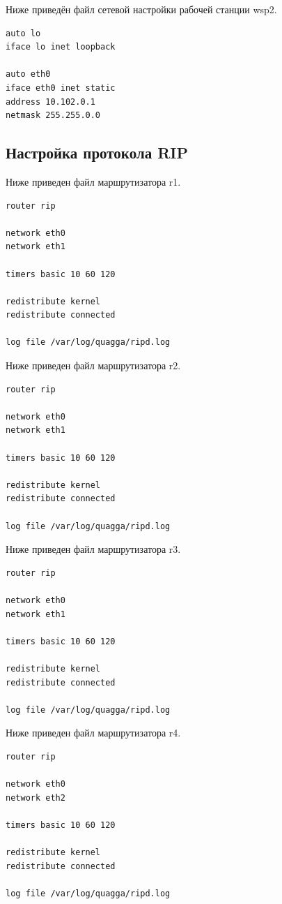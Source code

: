 \documentclass[a4paper,12pt]{article}
\begin{document}
Ниже приведён файл сетевой настройки рабочей станции wsp2.

\begin{Verbatim}
auto lo
iface lo inet loopback

auto eth0
iface eth0 inet static
address 10.102.0.1
netmask 255.255.0.0
\end{Verbatim}



\subsection{Настройка протокола RIP}

Ниже приведен файл  маршрутизатора r1.

\begin{Verbatim}
router rip

network eth0
network eth1

timers basic 10 60 120

redistribute kernel
redistribute connected

log file /var/log/quagga/ripd.log
\end{Verbatim}

Ниже приведен файл  маршрутизатора r2.

\begin{Verbatim}
router rip

network eth0
network eth1

timers basic 10 60 120

redistribute kernel
redistribute connected

log file /var/log/quagga/ripd.log
\end{Verbatim}

Ниже приведен файл  маршрутизатора r3.

\begin{Verbatim}
router rip

network eth0
network eth1

timers basic 10 60 120

redistribute kernel
redistribute connected

log file /var/log/quagga/ripd.log
\end{Verbatim}

Ниже приведен файл  маршрутизатора r4.

\begin{Verbatim}
router rip

network eth0
network eth2

timers basic 10 60 120

redistribute kernel
redistribute connected

log file /var/log/quagga/ripd.log
\end{Verbatim}
\end{document}
